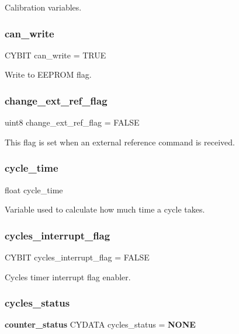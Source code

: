 Calibration variables. \mbox{\label{globals_8c_acd57396ca1b2a02a76877acecd29ddb0}} 
\subsubsection{can\+\_\+write}
{\footnotesize\ttfamily C\+Y\+B\+IT can\+\_\+write = T\+R\+UE}

Write to E\+E\+P\+R\+OM flag. \mbox{\label{globals_8c_a55787e40db60be586171023875f15130}} 
\subsubsection{change\+\_\+ext\+\_\+ref\+\_\+flag}
{\footnotesize\ttfamily uint8 change\+\_\+ext\+\_\+ref\+\_\+flag = F\+A\+L\+SE}

This flag is set when an external reference command is received. \mbox{\label{globals_8c_a910e6d34a0bb2e8dbaf576e06bdf56f5}} 
\subsubsection{cycle\+\_\+time}
{\footnotesize\ttfamily float cycle\+\_\+time}

Variable used to calculate how much time a cycle takes. \mbox{\label{globals_8c_a9c58c534e60c7991a92a13d012e7ef86}} 
\subsubsection{cycles\+\_\+interrupt\+\_\+flag}
{\footnotesize\ttfamily C\+Y\+B\+IT cycles\+\_\+interrupt\+\_\+flag = F\+A\+L\+SE}

Cycles timer interrupt flag enabler. \mbox{\label{globals_8c_a9087b28d15f17c6475922ba6943b14f3}} 
\subsubsection{cycles\+\_\+status}
{\footnotesize\ttfamily \textbf{ counter\+\_\+status} C\+Y\+D\+A\+TA cycles\+\_\+status = \textbf{ N\+O\+NE}}

